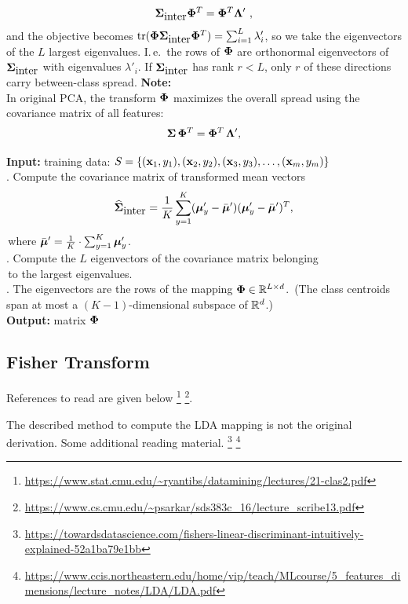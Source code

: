 	\begin{displaymath}
		\mathbf{\Sigma}_{\mbox{inter}} \mathbf{\Phi}^T = \mathbf{\Phi}^T \mathbf{\Lambda}'~,
	\end{displaymath} 
	and the objective becomes $\mbox{tr}(\mathbf{\Phi}\mathbf{\Sigma}_{\mbox{inter}}\mathbf{\Phi}^T)=\sum_{i=1}^L\lambda'_i$, so we take the eigenvectors of the $L$ largest eigenvalues.
	I.\,e.\ the rows of $\mathbf{\Phi}$ are orthonormal eigenvectors of $\mathbf{\Sigma}_{\mbox{inter}}$ with eigenvalues $\lambda'_i$. If $\mathbf{\Sigma}_{\mbox{inter}}$ has rank $r<L$, only $r$ of these directions carry between-class spread.
	\textbf{Note:} \\
	In original PCA, the transform $\mathbf{\Phi}$ maximizes the overall spread using the covariance matrix of all features:
	\begin{displaymath}
		\mathbf{\Sigma}\,\mathbf{\Phi}^T = \mathbf{\Phi}^T\,\mathbf{\Lambda}',
	\end{displaymath}
	\begin{algorithmic}
		\STATE  \textbf{Input:} training data:  $S = \{ (\bm{\mathrm{x}}_1, y_1), (\bm{\mathrm{x}}_2, y_2), (\bm{\mathrm{x}}_3, y_3), \dots, (\bm{\mathrm{x}}_m, y_m) \}$ \\
		. Compute the covariance matrix of transformed mean vectors
		$$\widehat{\mathbf{\Sigma}}_{\mbox{inter}} =
			\frac{1}{K} \sum_{y=1}^K (\bm{\mathrm{\mu}}'_y - \bar{\bm{\mathrm{\mu}}}')(\bm{\mathrm{\mu}}'_y - \bar{\bm{\mathrm{\mu}}}')^T,$$
		\quad\,where $\bar{\bm{\mathrm{\mu}}}' = \frac{1}{K} \cdot \sum_{y=1}^{K}\bm{\mathrm{\mu}}'_y$. \\
		. Compute the $L$ eigenvectors of the covariance matrix belonging \\
		\quad\,to the largest eigenvalues. \\
		. The eigenvectors are the rows of the mapping $\mathbf{\Phi}\in\mathbb{R}^{L\times d}$.
		\quad\,(The class centroids span at most a $(K-1)$-dimensional subspace of $\mathbb{R}^d$.) \\
		\STATE  \textbf{Output:} matrix $\mathbf{\Phi}$
	\end{algorithmic}
	
	\subsection{Fisher Transform}%
	References to read are given below \footnote{\url{https://www.stat.cmu.edu/~ryantibs/datamining/lectures/21-clas2.pdf}}%
	\footnote{\url{https://www.cs.cmu.edu/~psarkar/sds383c_16/lecture_scribe13.pdf}}.

	The described method to compute the LDA mapping is not the original derivation. Some additional reading material.\autocite{fisher1936,bishop2006}%
	\footnote{\url{https://towardsdatascience.com/fishers-linear-discriminant-intuitively-explained-52a1ba79e1bb}}%
	\footnote{\url{https://www.ccis.northeastern.edu/home/vip/teach/MLcourse/5_features_dimensions/lecture_notes/LDA/LDA.pdf}}

